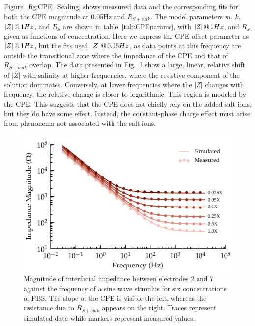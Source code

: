 \documentclass[journal, a4paper]{IEEEtran}
\begin{document}
Figure~\ref{fig:CPE_Scaling} shows measured data and the corresponding fits for both the CPE magnitude at 0.05\thinspace Hz and $R_{S+bulk}$. The model parameters $m$, $k$, $|Z|\thinspace @\thinspace 1Hz$, and $R_S$ are shown in table~\ref{tab:CPEparams}, with $|Z|\thinspace @\thinspace 1Hz$, and $R_S$ given as functions of concentration.
Here we express the CPE offset parameter as $|Z|\thinspace @ \thinspace 1Hz$, but the fits used $|Z|\thinspace @ \thinspace 0.05Hz$, as data points at this frequency are outside the transitional zone where the impedance of the CPE and that of $R_{S+bulk}$ overlap.
{
    \color{blue} The data presented in Fig.~\ref{fig:CPE_Magnitude} show a large, linear, relative shift of $|Z|$ with salinity at higher frequencies, where the resistive component of the solution dominates.
Conversely, at lower frequencies where the $|Z|$ changes with frequency, the relative change is closer to logarithmic. This region is modeled by the CPE.
This suggests that the CPE does not chiefly rely on the added salt ions, but they do have some effect.
Instead, the constant-phase charge effect must arise from phenonema not associated with the salt ions.
}


\begin{figure}
    \begin{center}
        \includegraphics{graphics/displacement_impedanceVsFrequency_magnitude}
    \end{center}
    \caption{Magnitude of interfacial impedance between electrodes 2 and 7 against the frequency of a sine wave stimulus for six concentrations of PBS. The slope of the CPE is visible the left, whereas the resistance due to $R_{S+bulk}$ appears on the right. Traces represent simulated data while markers represent measured values.}
    \label{fig:CPE_Magnitude}
\end{figure}
\end{document}
